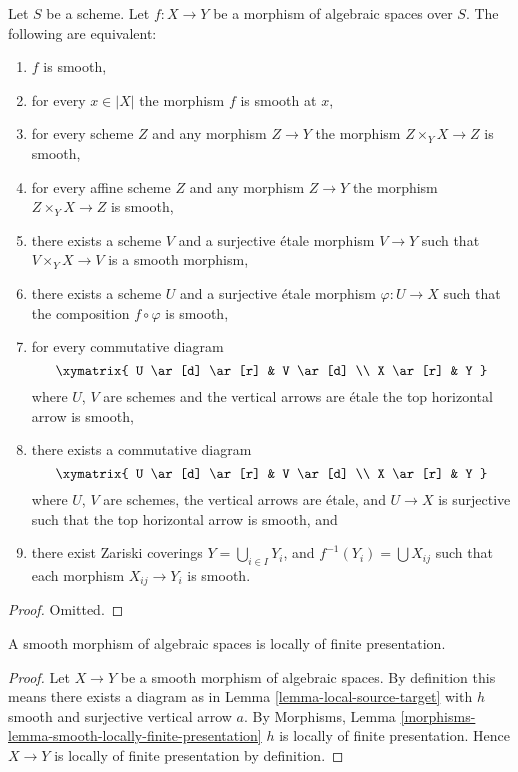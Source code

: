 \begin{lemma}
\label{lemma-smooth-local}
Let $S$ be a scheme.
Let $f : X \to Y$ be a morphism of algebraic spaces over $S$.
The following are equivalent:
\begin{enumerate}
\item $f$ is smooth,
\item for every $x \in |X|$ the morphism $f$ is smooth at $x$,
\item for every scheme $Z$ and any morphism $Z \to Y$ the morphism
$Z \times_Y X \to Z$ is smooth,
\item for every affine scheme $Z$ and any morphism
$Z \to Y$ the morphism $Z \times_Y X \to Z$ is smooth,
\item there exists a scheme $V$ and a surjective \'etale morphism
$V \to Y$ such that $V \times_Y X \to V$ is a smooth morphism,
\item there exists a scheme $U$ and a surjective \'etale morphism
$\varphi : U \to X$ such that the composition $f \circ \varphi$
is smooth,
\item for every commutative diagram
$$
\xymatrix{
U \ar[d] \ar[r] & V \ar[d] \\
X \ar[r] & Y
}
$$
where $U$, $V$ are schemes and the vertical arrows are \'etale
the top horizontal arrow is smooth,
\item there exists a commutative diagram
$$
\xymatrix{
U \ar[d] \ar[r] & V \ar[d] \\
X \ar[r] & Y
}
$$
where $U$, $V$ are schemes, the vertical arrows are \'etale, and $U \to X$ is
surjective such that the top horizontal arrow is smooth, and
\item there exist Zariski coverings $Y = \bigcup_{i \in I} Y_i$,
and $f^{-1}(Y_i) = \bigcup X_{ij}$ such that
each morphism $X_{ij} \to Y_i$ is smooth.
\end{enumerate}
\end{lemma}

\begin{proof}
Omitted.
\end{proof}

\begin{lemma}
\label{lemma-smooth-locally-finite-presentation}
A smooth morphism of algebraic spaces is locally of finite presentation.
\end{lemma}

\begin{proof}
Let $X \to Y$ be a smooth morphism of algebraic spaces. By
definition this means there exists a diagram as in
Lemma \ref{lemma-local-source-target}
with $h$ smooth and surjective vertical arrow $a$. By
Morphisms, Lemma \ref{morphisms-lemma-smooth-locally-finite-presentation}
$h$ is locally of finite presentation. Hence $X \to Y$ is
locally of finite presentation by definition.
\end{proof}


